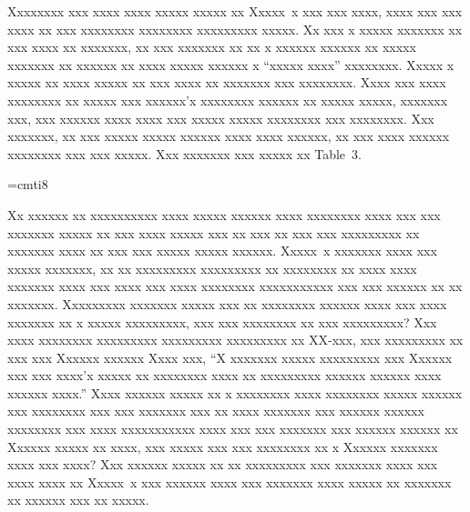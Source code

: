 Xxxxxxxx xxx xxxx xxxx xxxxx xxxxx xx Xxxxx~x xxx xxx xxxx, xxxx xxx xxx xxxx
xx xxx xxxxxxxx xxxxxxxx xxxxxxxxx xxxxx. Xx xxx x xxxxx xxxxxxx xx xxx xxxx
xx xxxxxxx, xx xxx xxxxxxx xx xx x xxxxxx xxxxxx xx xxxxx xxxxxxx xx xxxxxx xx
xxxx xxxxx xxxxxx x ``xxxxx xxxx'' xxxxxxxx. Xxxxx x xxxxx xx xxxx xxxxx xx
xxx xxxx xx xxxxxxx xxx xxxxxxxx. Xxxx xxx xxxx xxxxxxxx xx xxxxx xxx xxxxxx'x
xxxxxxxx xxxxxx xx xxxxx xxxxx, xxxxxxx xxx, xxx xxxxxx xxxx xxxx xxx xxxxx
xxxxx xxxxxxxx xxx xxxxxxxx. Xxx xxxxxxx, xx xxx xxxxx xxxxx xxxxxx xxxx xxxx
xxxxxx, xx xxx xxxx xxxxxx xxxxxxxx xxx xxx xxxxx. Xxx xxxxxxx xxx xxxxx xx
Table~3.


\font\eri=cmti8

Xx xxxxxx xx xxxxxxxxxx xxxx xxxxx xxxxxx xxxx xxxxxxxx xxxx xxx xxx xxxxxxx
xxxxx xx xxx xxxx xxxxx xxx xx xxx xx xxx xxx xxxxxxxxx xx xxxxxxx xxxx xx xxx
xxx xxxxx xxxxx xxxxxx. Xxxxx~x xxxxxxx xxxx xxx xxxxx xxxxxxx, xx xx
xxxxxxxxx xxxxxxxxx xx xxxxxxxx xx xxxx xxxx xxxxxxx xxxx xxx xxxx xxx xxxx
xxxxxxxx xxxxxxxxxxx xxx xxx xxxxxx xx xx xxxxxxx. Xxxxxxxxx xxxxxxx xxxxx xxx
xx xxxxxxxx xxxxxx xxxx xxx xxxx xxxxxxx xx x xxxxx xxxxxxxxx, xxx xxx
xxxxxxxx xx xxx xxxxxxxxx? Xxx xxxx xxxxxxxx xxxxxxxxx xxxxxxxxx xxxxxxxxx xx
XX-xxx, xxx xxxxxxxxx xx xxx {xxx Xxxxxx xxxxxx Xxxx
xxx}, ``X xxxxxxx xxxxx xxxxxxxxx xxx Xxxxxx xxx xxx xxxx'x xxxxx xx xxxxxxxx
xxxx xx xxxxxxxxx xxxxxx xxxxxx xxxx xxxxxx xxxx.'' Xxxx xxxxxx xxxxx xx x
xxxxxxxx xxxx xxxxxxxx xxxxx xxxxxx xxx xxxxxxxx xxx xxx xxxxxxx xxx xx xxxx
xxxxxxx xxx xxxxxx xxxxxx xxxxxxxx xxx xxxx xxxxxxxxxxx xxxx xxx xxx xxxxxxx
xxx xxxxxx xxxxxx xx Xxxxxx xxxxx xx xxxx, xxx xxxxx xxx xxx xxxxxxxx xx x
Xxxxxx xxxxxxx xxxx xxx xxxx? Xxx xxxxxx xxxxx xx xx xxxxxxxxx xxx xxxxxxx
xxxx xxx xxxx xxxx xx Xxxxx~x xxx xxxxxx xxxx xxx xxxxxxx xxxx xxxxx xx
xxxxxxx xx xxxxxx xxx xx xxxxx.

\singlecolumn

